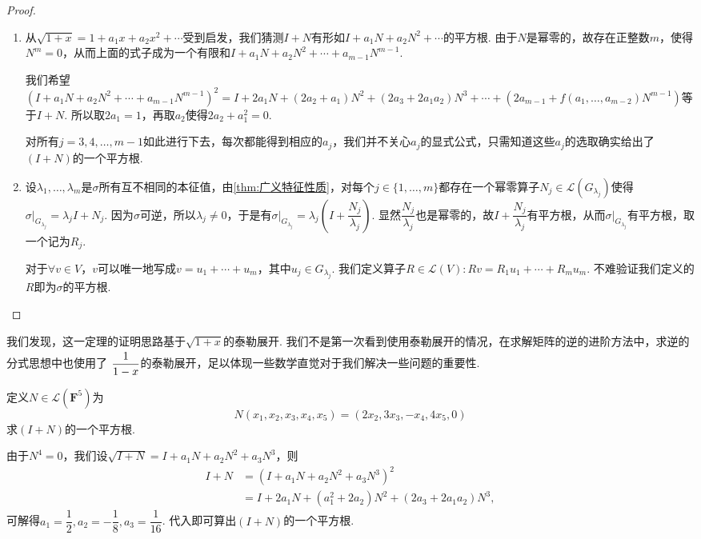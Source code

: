 \begin{proof}
    \begin{enumerate}
        \item 从$\sqrt{1+x}=1+a_1x+a_2x^2+\cdots$受到启发，我们猜测$I+N$有形如$I+a_1N+a_2N^2+\cdots$的平方根.
        由于$N$是幂零的，故存在正整数$m$，使得$N^m=0$，从而上面的式子成为一个有限和$I+a_1N+a_2N^2+\cdots+a_{m-1}N^{m-1}$.

        我们希望$(I+a_1N+a_2N^2+\cdots+a_{m-1}N^{m-1})^2=I+2a_1N+(2a_2+a_1)N^2+(2a_3+2a_1a_2)N^3+\cdots+(2a_{m-1}+f(a_1,\ldots,a_{m-2})N^{m-1})$等于$I+N$. 所以取$2a_1=1$，再取$a_2$使得$2a_2+a_1^2=0$.

        对所有$j=3,4,\ldots,m-1$如此进行下去，每次都能得到相应的$a_j$，我们并不关心$a_j$的显式公式，只需知道这些$a_j$的选取确实给出了$(I+N)$的一个平方根.

        \item 设$\lambda_1,\ldots,\lambda_m$是$\sigma$所有互不相同的本征值，由\autoref{thm:广义特征性质}，对每个$j\in\{1,\ldots,m\}$都存在一个幂零算子$N_j\in \mathcal{L}(G_{\lambda_j})$使得$\sigma\vert_{G_{\lambda_j}}=\lambda_j I+N_j$. 因为$\sigma$可逆，所以$\lambda_j \neq 0$，于是有$\sigma\vert_{G_{\lambda_j}}=\lambda_j(I+\dfrac{N_j}{\lambda_j})$. 显然$\dfrac{N_j}{\lambda_j}$也是幂零的，故$I+\dfrac{N_j}{\lambda_j}$有平方根，从而$\sigma\vert_{G_{\lambda_j}}$有平方根，取一个记为$R_j$.

        对于$\forall v\in V$，$v$可以唯一地写成$v=u_1+\cdots+u_m$，其中$u_j\in G_{\lambda_j}$. 我们定义算子$R\in\mathcal{L}(V)\colon Rv=R_1u_1+\cdots+R_mu_m$. 不难验证我们定义的$R$即为$\sigma$的平方根.
    \end{enumerate}
\end{proof}

我们发现，这一定理的证明思路基于$\sqrt{1+x}$的泰勒展开. 我们不是第一次看到使用泰勒展开的情况，在求解矩阵的逆的进阶方法中，求逆的分式思想中也使用了 $\vphantom{\cfrac{1}{1-x}}\dfrac{1}{1-x}$的泰勒展开，足以体现一些数学直觉对于我们解决一些问题的重要性.

\begin{example}{}{}
    定义$N\in \mathcal{L}(\mathbf{F}^5)$为
    \[N(x_1,x_2,x_3,x_4,x_5)=(2x_2,3x_3,-x_4,4x_5,0)\]
    求$(I+N)$的一个平方根.
\end{example}

\begin{solution}
    由于$N^4=0$，我们设$\sqrt{I+N}=I+a_1N+a_2N^2+a_3N^3$，则
    \begin{align*}
        I+N&=(I+a_1N+a_2N^2+a_3N^3)^2 \\
        &=I+2a_1N+(a_1^2+2a_2)N^2+(2a_3+2a_1a_2)N^3,
    \end{align*}
    可解得$a_1=\dfrac{1}{2},a_2=-\dfrac{1}{8},a_3=\dfrac{1}{16}$. 代入即可算出$(I+N)$的一个平方根.
\end{solution}

